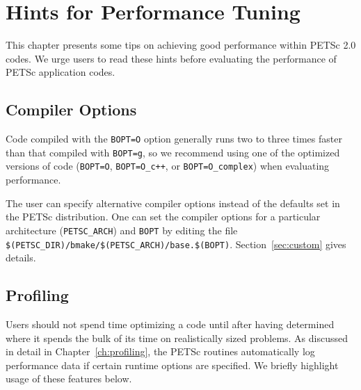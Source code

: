 \chapter{Hints for Performance Tuning} 
\label{ch:performance} 

This chapter presents some tips on achieving good performance within
PETSc 2.0 codes.  We urge users to read these hints before
evaluating the performance of PETSc application codes.

\section{Compiler Options}

Code compiled with the {\tt BOPT=O} option generally runs two to three times
faster than that compiled with {\tt BOPT=g}, so we recommend using one
of the optimized versions of code ({\tt BOPT=O}, {\tt BOPT=O\_c++}, or
{\tt BOPT=O\_complex}) when evaluating performance.

The user can specify alternative compiler options instead of
the defaults set in the PETSc distribution.  One can set
the compiler options for a particular architecture
({\tt PETSC\_ARCH}) and {\tt BOPT} by editing the file
{\tt \$(PETSC\_DIR)/bmake/\$(PETSC\_ARCH)/base.\$(BOPT)}.
Section~\ref{sec:custom} gives details.

\section{Profiling}
  

Users should not spend time optimizing a code until after having determined
where it spends the bulk of its time on realistically sized problems.
As discussed in detail in Chapter~\ref{ch:profiling}, the PETSc
routines automatically log performance data if certain runtime options
are specified.  We briefly highlight usage of these features below.

